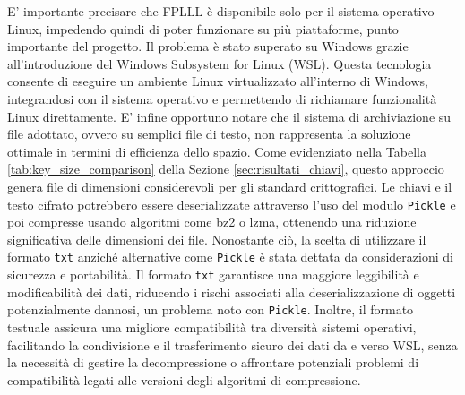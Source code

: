 E' importante precisare che FPLLL è disponibile solo per il sistema operativo Linux, impedendo
quindi di poter funzionare su più piattaforme, punto importante del progetto. Il problema 
è stato superato su Windows grazie all'introduzione del Windows Subsystem for Linux (WSL). 
Questa tecnologia consente di eseguire un ambiente Linux virtualizzato  
all'interno di Windows, integrandosi con il sistema operativo e permettendo di richiamare 
funzionalità Linux direttamente.
E' infine opportuno notare che il sistema di archiviazione su file adottato, ovvero su 
semplici file di testo, non 
rappresenta la soluzione ottimale in termini di efficienza dello spazio. 
Come evidenziato nella Tabella \ref{tab:key_size_comparison} della Sezione 
\ref{sec:risultati_chiavi}, questo approccio genera file di dimensioni considerevoli 
per gli standard crittografici. Le chiavi e il testo cifrato potrebbero essere deserializzate
attraverso l'uso del modulo \texttt{Pickle} e poi compresse usando algoritmi come bz2 o lzma, 
ottenendo una riduzione significativa delle dimensioni dei file. 
Nonostante ciò, la scelta di utilizzare il formato \texttt{txt} anziché alternative come \texttt{Pickle} 
è stata dettata da considerazioni di sicurezza e portabilità. Il formato \texttt{txt} garantisce 
una maggiore leggibilità e modificabilità dei dati, riducendo i rischi associati alla 
deserializzazione di oggetti potenzialmente dannosi, un problema noto con \texttt{Pickle}. 
Inoltre, il formato testuale assicura una migliore compatibilità tra diversità
sistemi operativi, facilitando la condivisione e il trasferimento sicuro 
dei dati da e verso WSL, senza la necessità di gestire la decompressione o affrontare
potenziali problemi di compatibilità legati alle versioni degli algoritmi di compressione. 

%
%

%
%
